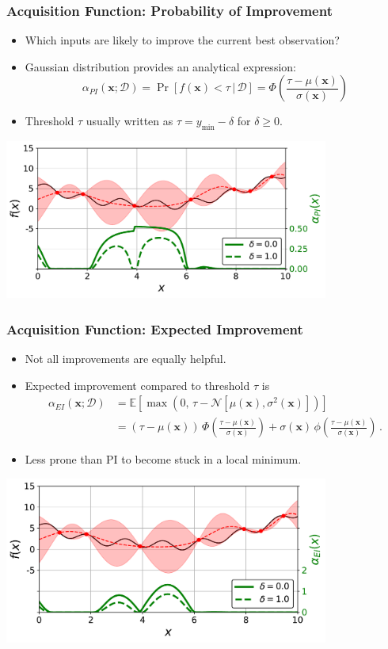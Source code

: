 \documentclass{beamer}
\newcommand{\vect}[1]{\boldsymbol{#1}}
\newcommand{\E}[1]{\mathbb{E}\left[#1\right]}
\newcommand{\nml}{\mathcal{N}}
\begin{document}
	\begin{frame}
		\frametitle{Acquisition Function: Probability of Improvement}
		\begin{itemize}
			\item Which inputs are likely to improve the current best observation?
			\item Gaussian distribution provides an analytical expression: $$\alpha_{PI}(\vect{x};\mathcal{D})=\Pr[f(\vect{x})<\tau\,|\,\mathcal{D}]=\Phi\left(\frac{\tau-\mu(\vect{x})}{\sigma(\vect{x})}\right)$$
			\item Threshold $\tau$ usually written as $\tau=y_{\text{min}}-\delta$ for $\delta\geq0$.
		\end{itemize}
		\begin{center}
			\includegraphics[width=0.8\textwidth]{figures/08a_PI.pdf}
		\end{center}
	\end{frame}
	
	\begin{frame}
		\frametitle{Acquisition Function: Expected Improvement}
		\begin{itemize}
			\item Not all improvements are equally helpful.
			\item Expected improvement compared to threshold $\tau$ is
			\begin{align*}
				\alpha_{EI}(\vect{x};\mathcal{D}) & =\E{\max(0,\,\tau-\nml\left[\mu(\vect{x}),\sigma^2(\vect{x})\right])}\\
				& =(\tau-\mu(\vect{x}))\,\Phi\left(\frac{\tau-\mu(\vect{x})}{\sigma(\vect{x})}\right)+\sigma(\vect{x})\,\phi\left(\frac{\tau-\mu(\vect{x})}{\sigma(\vect{x})}\right)\,.
			\end{align*}
			\item Less prone than PI to become stuck in a local minimum.
		\end{itemize}
		\begin{center}
			\includegraphics[width=0.8\textwidth]{figures/08b_EI.pdf}
		\end{center}
	\end{frame}
	
\end{document}
